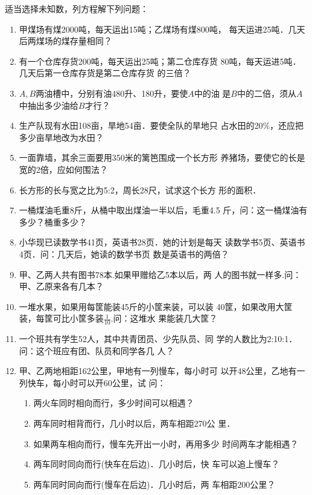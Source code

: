 适当选择未知数，列方程解下列问题：
\begin{enumerate}
    \item 甲煤场有煤2000吨，每天运出15吨；乙煤场有煤800吨，
每天运进25吨．几天后两煤场的煤存量相同？
\item 有一个仓库存货200吨，每天运出25吨；第二仓库存货
80吨，每天运进5吨．几天后第一仓库存货是第二仓库存货
的三倍？
\item  $A, B$两油槽中，分别有油480升、180升，要使$A$中的油
是$B$中的二倍，须从$A$中抽出多少油给$B$才行？
\item 生产队现有水田108亩，旱地54亩．要使全队的旱地只
占水田的20\%，还应把多少亩旱地改为水田？
\item 一面靠墙，其余三面要用350米的篱笆围成一个长方形
养猪场，要使它的长是宽的2倍，应如何围法？
\item 长方形的长与宽之比为5:2，周长28尺，试求这个长方
形的面积．
\item 一桶煤油毛重8斤，从桶中取出煤油一半以后，毛重4.5
斤，问：这一桶煤油有多少？桶重多少？
\item 小华现已读数学书41页，英语书28页．她的计划是每天
读数学书5页、英语书4页．问：几天后，她读的数学书页
数是英语书的两倍？
\item 甲、乙两人共有图书78本.如果甲赠给乙5本以后，两
人的图书就一样多.问：甲、乙原来各有几本？
\item 一堆水果，如果用每筐能装45斤的小筐来装，可以装
40筐，如果改用大筐装，每筐可比小筐多装$\frac{1}{10}$.问：这堆水
果能装几大筐？
\item 一个班共有学生52人，其中共青团员、少先队员、同
学的人数比为2:10:1．问：这个班应有团、队员和同学各几
人？
\item 甲、乙两地相距162公里，甲地有一列慢车，每小时可
以开48公里，乙地有一列快车，每小时可以开60公里，试
问：
\begin{enumerate}
    \item  两火车同时相向而行，多少时间可以相遇？
    \item  两车同时相背而行，几小时以后，两车相距270公
里．
\item  如果两车相向而行，慢车先开出一小时，再用多少
时间两车才能相遇？
\item  两车同时同向而行(快车在后边)．几小时后，快
车可以追上慢车？
\item  两车同时同向而行(慢车在后边)．几小时后，两
车相距200公里？
\end{enumerate}
 

\end{enumerate}
